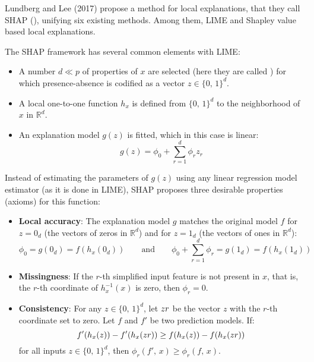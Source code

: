 Lundberg and Lee (2017) propose a method for local explanations, that they call
SHAP (), unifying six existing methods.
Among them, LIME and Shapley value based local explanations.

The SHAP framework has several common elements with LIME:
\begin{itemize}
	\item A number $d \ll p$ of properties of $x$ are selected (here they are called
	      ) for which presence-absence is codified
	      as a vector $z \in \{0,\,1\}^d$.
	\item A local one-to-one function $h_x$ is defined from $\{0,\,1\}^d$ to the
	      neighborhood of $x$ in $\mathds R^d$.
	\item An explanation model $g(z)$ is fitted, which in this case is linear:
	      \begin{equation*}
		      g(z) = \phi_0 + \sum_{r = 1}^d \phi_r z_r
	      \end{equation*}
\end{itemize}

Instead of estimating the parameters of $g(z)$ using any linear
regression model estimator (as it is done in LIME), SHAP proposes
three desirable properties (axioms) for this function:
\begin{itemize}
	\item \textbf{Local accuracy}: The explanation model $g$ matches the original
	      model $f$ for $z = 0_d$ (the vectors of zeros in $\mathds R^d$) and for
	      $z = 1_d$ (the vectors of ones in $\mathds R^d$):
	      \begin{equation*}
		      \phi_0 = g(0_d) = f(h_x(0_d)) \qquad \text{and} \qquad \phi_0 + \sum_{r = 1}^d \phi_r = g(1_d) = f(h_x(1_d))
	      \end{equation*}
	\item \textbf{Missingness}: If the $r$-th simplified input feature is not present in $x$,
	      that is, the $r$-th coordinate of $h_x^{-1}(x)$ is zero, then $\phi_r = 0$.
	\item \textbf{Consistency}: For any $z \in \{0,\,1\}^d$, let $z \\ r$ be the vector $z$ with
	      the $r$-th coordinate set to zero. Let $f$ and $f'$ be two prediction models. If:
	      \begin{equation*}
		      f'(h_x(z)) - f'(h_x(z \\ r)) \geq f(h_x(z)) - f(h_x(z \\ r))
	      \end{equation*}
	      for all inputs $z \in \{0,\,1\}^d$, then $\phi_r(f',\,x) \geq \phi_r(f,\,x)$.
\end{itemize}

